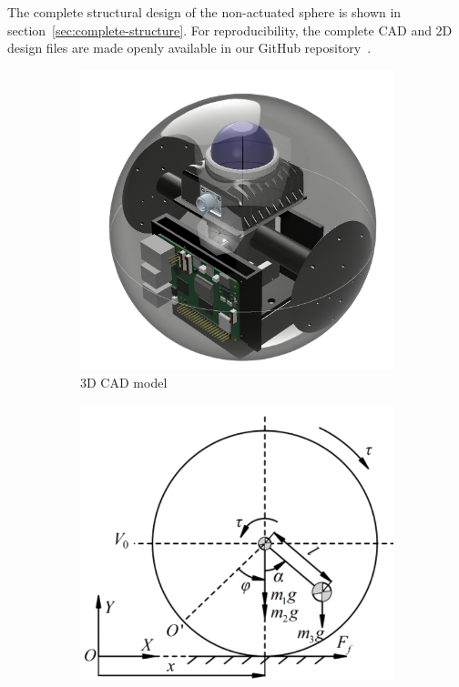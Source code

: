 \documentclass[english, bachelor, utf8]{base/thesis_telematics}
\begin{document}
The complete structural design of the non-actuated sphere is shown in section~\ref{sec:complete-structure}.
For reproducibility, the complete CAD and 2D design files are made openly available in our GitHub repository~\cite{githubsphere}.
\clearpage


\begin{figure}[ht]
\begin{subfigure}{0.47\columnwidth}
    \centering
    \includegraphics[width=\textwidth]{pics/Actuated_sphere.png}
    \caption{3D CAD model}
    \label{fig:cad-design2}
\end{subfigure}
\hfill
\begin{subfigure}{0.52\columnwidth}
    \centering
    \includegraphics[width=\textwidth]{pics/planer_model.png}

\end{subfigure}
\end{figure}
\end{document}
